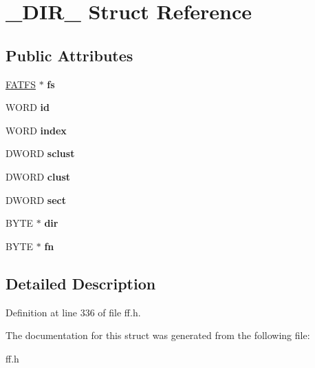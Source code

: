 \hypertarget{struct__DIR__}{\section{\-\_\-\-D\-I\-R\-\_\- Struct Reference}
\label{struct__DIR__}
}
\subsection*{Public Attributes}
\begin{DoxyCompactItemize}
\item 
\hypertarget{struct__DIR___a34e6247a6b7c8a7c65b93986d197dc95}{\hyperlink{struct__FATFS__}{F\-A\-T\-F\-S} $\ast$ {\bfseries fs}}\label{struct__DIR___a34e6247a6b7c8a7c65b93986d197dc95}

\item 
\hypertarget{struct__DIR___a252dbe253bcf5bb459f0b635bd97764e}{W\-O\-R\-D {\bfseries id}}\label{struct__DIR___a252dbe253bcf5bb459f0b635bd97764e}

\item 
\hypertarget{struct__DIR___a0fa27ba0faed15f6f6838af8920a82e7}{W\-O\-R\-D {\bfseries index}}\label{struct__DIR___a0fa27ba0faed15f6f6838af8920a82e7}

\item 
\hypertarget{struct__DIR___aadf2794cf19475948f3e6c4e723a854f}{D\-W\-O\-R\-D {\bfseries sclust}}\label{struct__DIR___aadf2794cf19475948f3e6c4e723a854f}

\item 
\hypertarget{struct__DIR___acb428efce0f1dafc126e8461fcf5fe26}{D\-W\-O\-R\-D {\bfseries clust}}\label{struct__DIR___acb428efce0f1dafc126e8461fcf5fe26}

\item 
\hypertarget{struct__DIR___a9c9049178afdb8010daf14c9502535ae}{D\-W\-O\-R\-D {\bfseries sect}}\label{struct__DIR___a9c9049178afdb8010daf14c9502535ae}

\item 
\hypertarget{struct__DIR___a9ca5b788efa7610794c5a2496edd0ae7}{B\-Y\-T\-E $\ast$ {\bfseries dir}}\label{struct__DIR___a9ca5b788efa7610794c5a2496edd0ae7}

\item 
\hypertarget{struct__DIR___a4b32ccbfaebafea274866bcfd110389a}{B\-Y\-T\-E $\ast$ {\bfseries fn}}\label{struct__DIR___a4b32ccbfaebafea274866bcfd110389a}

\end{DoxyCompactItemize}


\subsection{Detailed Description}


Definition at line 336 of file ff.\-h.



The documentation for this struct was generated from the following file\-:\begin{DoxyCompactItemize}
\item 
ff.\-h\end{DoxyCompactItemize}
